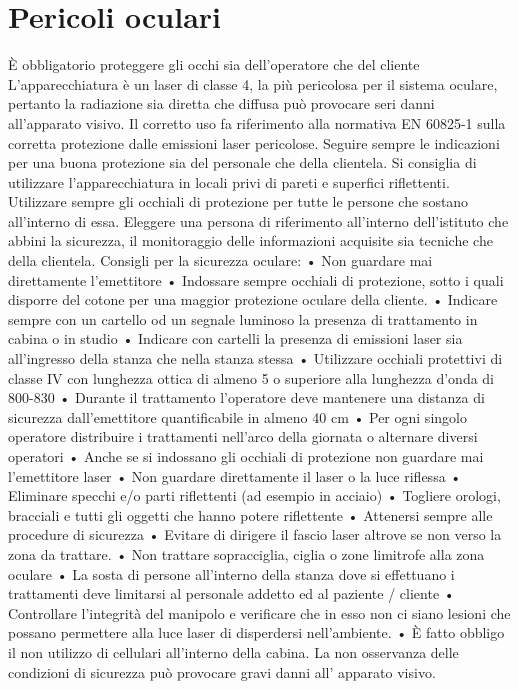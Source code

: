 \documentclass[10pt]{article}
\begin{document}
\section{Pericoli oculari}
È obbligatorio proteggere gli occhi sia dell'operatore che del cliente L'apparecchiatura è un laser di classe 4, la più pericolosa per il sistema oculare, pertanto la radiazione sia diretta che diffusa può provocare seri danni all'apparato visivo. Il corretto uso fa riferimento alla normativa EN 60825-1 sulla corretta protezione dalle emissioni laser pericolose. Seguire sempre le indicazioni per una buona protezione sia del personale che della clientela. Si consiglia di utilizzare l'apparecchiatura in locali privi di pareti e superfici riflettenti. Utilizzare sempre gli occhiali di protezione per tutte le persone che sostano all'interno di essa. Eleggere una persona di riferimento all'interno dell'istituto che abbini la sicurezza, il monitoraggio delle informazioni acquisite sia tecniche che della clientela. Consigli per la sicurezza oculare: • Non guardare mai direttamente l'emettitore • Indossare sempre occhiali di protezione, sotto i quali disporre del cotone per una maggior protezione oculare della cliente. • Indicare sempre con un cartello od un segnale luminoso la presenza di trattamento in cabina o in studio • Indicare con cartelli la presenza di emissioni laser sia all'ingresso della stanza che nella stanza stessa • Utilizzare occhiali protettivi di classe IV con lunghezza ottica di almeno 5 o superiore alla lunghezza d'onda di 800-830 • Durante il trattamento l'operatore deve mantenere una distanza di sicurezza dall'emettitore quantificabile in almeno 40 cm • Per ogni singolo operatore distribuire i trattamenti nell'arco della giornata o alternare diversi operatori • Anche se si indossano gli occhiali di protezione non guardare mai l'emettitore laser • Non guardare direttamente il laser o la luce riflessa • Eliminare specchi e/o parti riflettenti (ad esempio in acciaio) • Togliere orologi, bracciali e tutti gli oggetti che hanno potere riflettente • Attenersi sempre alle procedure di sicurezza • Evitare di dirigere il fascio laser altrove se non verso la zona da trattare. • Non trattare sopracciglia, ciglia o zone limitrofe alla zona oculare • La sosta di persone all'interno della stanza dove si effettuano i trattamenti deve limitarsi al personale addetto ed al paziente / cliente • Controllare l'integrità del manipolo e verificare che in esso non ci siano lesioni che possano permettere alla luce laser di disperdersi nell'ambiente. • È fatto obbligo il non utilizzo di cellulari all'interno della cabina. La non osservanza delle condizioni di sicurezza può provocare gravi danni all’ apparato visivo.
\end{document}
